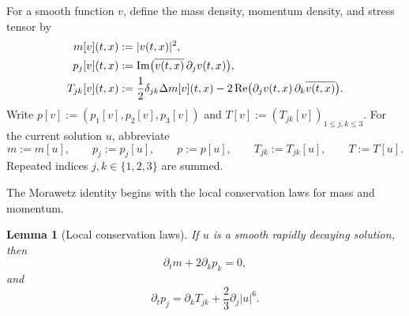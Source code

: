\documentclass{interact}
\numberwithin{equation}{section}
\theoremstyle{plain}
\newtheorem{lemma}[theorem]{Lemma}
\theoremstyle{definition}
\theoremstyle{remark}
\newcommand{\Rea}{\operatorname{Re}}
\newcommand{\Ima}{\operatorname{Im}}
\begin{document}
For a smooth function $v$, define the mass density, momentum density, and stress tensor by
\begin{align}
 m[v](t,x)&:=|v(t,x)|^2,\notag\\
 p_j[v](t,x)&:=\Ima\bigl(\overline{v(t,x)}\,\partial_jv(t,x)\bigr),\notag\\
 T_{jk}[v](t,x)&:=\frac12\delta_{jk}\Delta m[v](t,x)
 -2\Rea\bigl(\partial_jv(t,x)\,\partial_k\overline{v(t,x)}\bigr).
 \label{eq:T-def}
\end{align}
Write $p[v]:=(p_1[v],p_2[v],p_3[v])$ and $T[v]:=(T_{jk}[v])_{1\le j,k\le3}$. For the current solution $u$, abbreviate
\[
 m:=m[u],\qquad p_j:=p_j[u],\qquad p:=p[u],\qquad
 T_{jk}:=T_{jk}[u],\qquad T:=T[u].
\]
Repeated indices $j,k\in\{1,2,3\}$ are summed.

The Morawetz identity begins with the local conservation laws for mass and momentum.

\begin{lemma}[Local conservation laws]\label{lem:local-laws}
If $u$ is a smooth rapidly decaying solution, then
\begin{equation}\label{eq:local-mass-law}
 \partial_tm+2\partial_kp_k=0,
\end{equation}
and
\begin{equation}\label{eq:local-momentum-law}
 \partial_tp_j
 =\partial_kT_{jk}+\frac23\partial_j|u|^6.
\end{equation}
\end{lemma}
\end{document}
